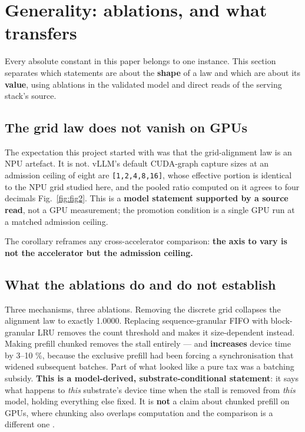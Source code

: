 
\section{Generality: ablations, and what transfers}
\label{sec:07}

Every absolute constant in this paper belongs to one instance. This section separates which statements are about the \textbf{shape} of a law and which are about its \textbf{value}, using ablations in the validated model and direct reads of the serving stack's source.

\subsection{The grid law does not vanish on GPUs}

The expectation this project started with was that the grid-alignment law is an NPU artefact. It is not. vLLM's default CUDA-graph capture sizes at an admission ceiling of eight are \texttt{[1,2,4,8,16]}, whose effective portion is identical to the NPU grid studied here, and the pooled ratio computed on it agrees to four decimals Fig.~\ref{fig:fig2}. This is a \textbf{model statement supported by a source read}, not a GPU measurement; the promotion condition is a single GPU run at a matched admission ceiling.

The corollary reframes any cross-accelerator comparison: \textbf{the axis to vary is not the accelerator but the admission ceiling.}

\subsection{What the ablations do and do not establish}

Three mechanisms, three ablations. Removing the discrete grid collapses the alignment law to exactly 1.0000. Replacing sequence-granular FIFO with block-granular LRU removes the count threshold and makes it size-dependent instead. Making prefill chunked removes the stall entirely --- and \textbf{increases} device time by 3--10 \%, because the exclusive prefill had been forcing a synchronisation that widened subsequent batches. Part of what looked like a pure tax was a batching subsidy. \textbf{This is a model-derived, substrate-conditional statement}: it says what happens to \emph{this} substrate's device time when the stall is removed from \emph{this} model, holding everything else fixed. It is \textbf{not} a claim about chunked prefill on GPUs, where chunking also overlaps computation and the comparison is a different one \cite{sarathi2024}.

